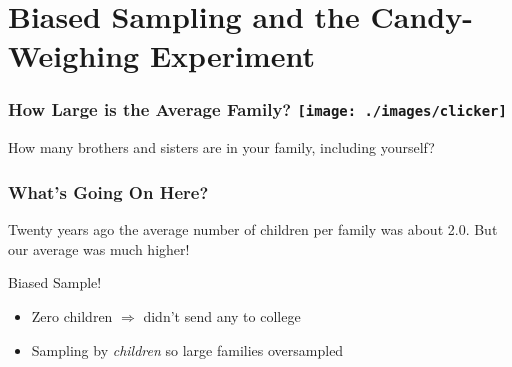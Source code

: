 \section{Biased Sampling and the Candy-Weighing Experiment}

\begin{frame}
\frametitle{How Large is the Average Family? \hfill\texttt{[image: ./images/clicker]}}

\Large How many brothers and sisters are in your family, including yourself?

\end{frame}

\begin{frame}
\frametitle{What's Going On Here?}

Twenty years ago the average number of children per family was about 2.0.
But our average was much higher! 

\pause

\begin{alertblock}{Biased Sample!}
\begin{itemize}
 	\item  Zero children $\Rightarrow$ didn't send any to college
 	\item Sampling by \emph{children} so large families \alert{oversampled}
\end{itemize}
\end{alertblock}



\end{frame}

